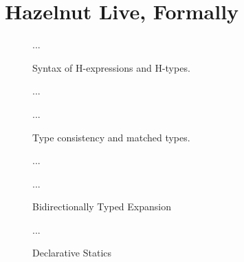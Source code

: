 
\clearpage
\newcommand{\calculusSec}{Hazelnut Live, Formally}
\section{\protect\calculusSec}
\label{sec:calculus}

\begin{figure}[h]
...
\caption{Syntax of H-expressions and H-types.}
\end{figure}

\begin{figure}[h]
...

...
\caption{Type consistency and matched types.}
\end{figure}

\begin{figure}[h]
...

...
\caption{Bidirectionally Typed Expansion}
\end{figure}

\begin{figure}[h!]
...
\caption{Declarative Statics}
\end{figure}

